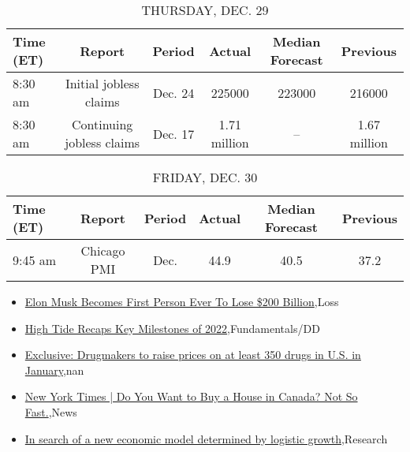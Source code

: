 \documentclass{article}%
\begin{document}
%


\begin{table}[htbp]%
\caption{THURSDAY, DEC. 29}%
\centering%
\begin{adjustbox}{width=1\textwidth}%
\begin{tabular}{lccccc}
\toprule
Time (ET) &                    Report &  Period &       Actual & Median Forecast &     Previous \\
\midrule
  8:30 am &    Initial jobless claims & Dec. 24 &       225000 &          223000 &       216000 \\
  8:30 am & Continuing jobless claims & Dec. 17 & 1.71 million &              -- & 1.67 million \\
\bottomrule
\end{tabular}
%
\end{adjustbox}%
\end{table}

%


\begin{table}[htbp]%
\caption{FRIDAY, DEC. 30}%
\centering%
\begin{adjustbox}{width=1\textwidth}%
\begin{tabular}{lccccc}
\toprule
Time (ET) &      Report & Period & Actual & Median Forecast & Previous \\
\midrule
  9:45 am & Chicago PMI &   Dec. &   44.9 &            40.5 &     37.2 \\
\bottomrule
\end{tabular}
%
\end{adjustbox}%
\end{table}

%
\begin{itemize}%
\item%
\href{https://reddit.com/r/wallstreetbets/comments/zzrp41/elon\_musk\_becomes\_first\_person\_ever\_to\_lose\_200/}{Elon Musk Becomes First Person Ever To Lose \$200 Billion},Loss%
\item%
\href{https://reddit.com/r/StockMarket/comments/zzraan/high\_tide\_recaps\_key\_milestones\_of\_2022/}{High Tide Recaps Key Milestones of 2022},Fundamentals/DD%
\item%
\href{https://reddit.com/r/Economics/comments/zzn59a/exclusive\_drugmakers\_to\_raise\_prices\_on\_at\_least/}{Exclusive: Drugmakers to raise prices on at least 350 drugs in U.S. in January},nan%
\item%
\href{https://reddit.com/r/Economics/comments/zzj9ej/new\_york\_times\_do\_you\_want\_to\_buy\_a\_house\_in/}{New York Times | Do You Want to Buy a House in Canada? Not So Fast.},News%
\item%
\href{https://reddit.com/r/Economics/comments/zz8prs/in\_search\_of\_a\_new\_economic\_model\_determined\_by/}{In search of a new economic model determined by logistic growth},Research%
\end{itemize}%
\end{document}
